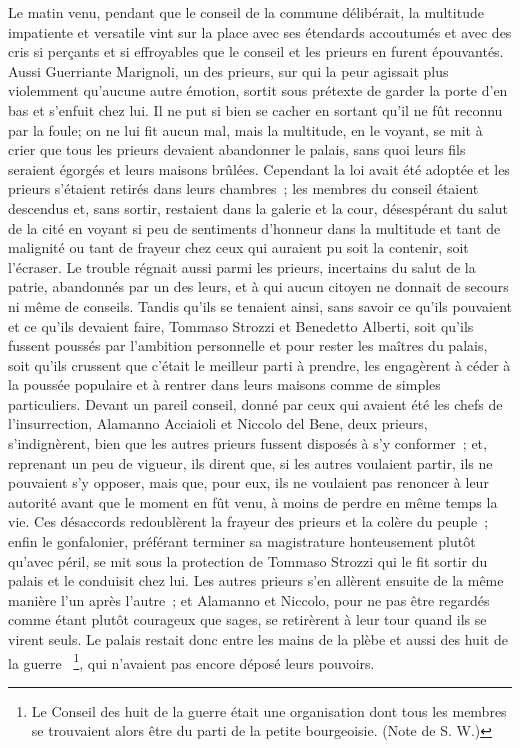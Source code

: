 \documentclass[french,twoside]{book} %
\newenvironment{quoteblock}%
  {\begin{quoting}}
  {\end{quoting}}
\newenvironment{quotebar}{%
    \def\FrameCommand{{\color{rubric!10!}\vrule width 0.5em} \hspace{0.9em}}%
    \def\OuterFrameSep{\itemsep} %
    \MakeFramed {\advance\hsize-\width \FrameRestore}
  }%
  {%
    \endMakeFramed
  }
\renewenvironment{quoteblock}%
  {%
    \savenotes
    \setstretch{0.9}
    \normalfont
    \begin{quotebar}
  }
  {%
    \end{quotebar}
    \spewnotes
  }
\begin{document}
\begin{quoteblock}
 Le matin venu, pendant que le conseil de la commune délibérait, la multi­tude impatiente et versatile vint sur la place avec ses étendards accoutumés et avec des cris si perçants et si effroyables que le conseil et les prieurs en furent épouvantés. Aussi Guerriante Marignoli, un des prieurs, sur qui la peur agissait plus violemment qu'aucune autre émotion, sortit sous prétexte de garder la porte d'en bas et s'enfuit chez lui. Il ne put si bien se cacher en sor­tant qu'il ne fût reconnu par la foule; on ne lui fit aucun mal, mais la multitude, en le voyant, se mit à crier que tous les prieurs devaient abandonner le palais, sans quoi leurs fils seraient égorgés et leurs maisons brûlées. Cependant la loi avait été adoptée et les prieurs s'étaient retirés dans leurs chambres ; les membres du conseil étaient descendus et, sans sortir, restaient dans la galerie et la cour, désespérant du salut de la cité en voyant si peu de sentiments d'honneur dans la multitude et tant de malignité ou tant de frayeur chez ceux qui auraient pu soit la contenir, soit l'écraser. Le trouble régnait aussi parmi les prieurs, incertains du salut de la patrie, abandonnés par un des leurs, et à qui aucun citoyen ne donnait de secours ni même de conseils. Tandis qu'ils se tenaient ainsi, sans savoir ce qu'ils pouvaient et ce qu'ils devaient faire, Tommaso Strozzi et Benedetto Alberti, soit qu'ils fussent poussés par l'ambition personnelle et pour rester les maîtres du palais, soit qu'ils crussent que c'était le meilleur parti à prendre, les engagèrent à céder à la poussée populaire et à rentrer dans leurs maisons comme de simples particuliers. Devant un pareil conseil, donné par ceux qui avaient été les chefs de l'insurrection, Alamanno Acciaioli et Niccolo del Bene, deux prieurs, s'indignèrent, bien que les autres prieurs fussent disposés à s'y conformer ; et, reprenant un peu de vigueur, ils dirent que, si les autres voulaient partir, ils ne pouvaient s'y opposer, mais que, pour eux, ils ne voulaient pas renoncer à leur autorité avant que le moment en fût venu, à moins de perdre en même temps la vie. Ces désaccords redoublèrent la frayeur des prieurs et la colère du peuple ; enfin le gonfalonier, préférant terminer sa magistrature honteusement plutôt qu'avec péril, se mit sous la protection de Tommaso Strozzi qui le fit sortir du palais et le conduisit chez lui. Les autres prieurs s'en allèrent ensuite de la même manière l'un après l'autre ; et Alamanno et Niccolo, pour ne pas être regardés comme étant plutôt courageux que sages, se retirèrent à leur tour quand ils se virent seuls. Le palais restait donc entre les mains de la plèbe et aussi des huit de la guerre  \footnote{Le Conseil des huit de la guerre était une organisation dont tous les membres se trouvaient alors être du parti de la petite bourgeoisie. (Note de S. W.)}, qui n'avaient pas encore déposé leurs pouvoirs. \par

\end{quoteblock}
\end{document}
